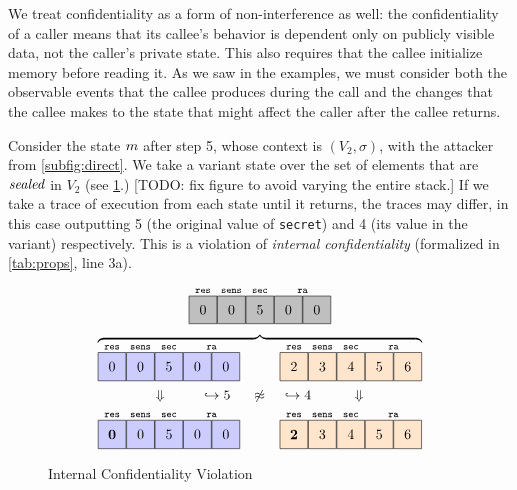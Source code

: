 \documentclass[10pt,conference]{ieeetran}%
\theoremstyle{definition}
\begin{document}
We treat confidentiality as a form of non-interference as well: the confidentiality of a caller
means that its callee's behavior is dependent only on publicly visible data,
not the caller's private state. This also requires that the callee initialize
memory before reading it.
As we saw in the examples, we must consider both the observable events
that the callee produces during the call and the changes that the callee makes to the state that might
affect the caller after the callee returns.

Consider the state \(m\) after step 5, whose context is \((V_2,\sigma)\), with the attacker from
\cref{subfig:direct}. We take a variant state over the set of elements that are
\(\mathit{sealed}\) in \(V_2\) (see \cref{fig:variant2}.)
            [TODO: fix figure to avoid varying the entire stack.]
If we take a trace of execution from each state until it returns,
the traces may differ, in this case outputting 5 (the original value of {\tt secret}) and
4 (its value in the variant) respectively. This is a violation of
{\it internal confidentiality} (formalized in \cref{tab:props}, line 3a).

\begin{figure}
    \centering
    \[
    \stackrel{\texttt{res}}{\numbox[0]}
    \stackrel{\texttt{sens}}{\numbox[0]}
    \stackrel{\texttt{sec}}{\numbox[5]}
    \stackrel{\texttt{ra}}{\numbox[0]\numbox[0]}\]
    \[\overbrace{
    \stackrel{\texttt{res}}{\leftbox[0]}
    \stackrel{\texttt{sens}}{\leftbox[0]}
    \stackrel{\texttt{sec}}{\leftbox[5]}
    \stackrel{\texttt{ra}}{\leftbox[0]\leftbox[0]}
    \hspace{1cm}
    \stackrel{\texttt{res}}{\rightbox[2]}
    \stackrel{\texttt{sens}}{\rightbox[3]}
    \stackrel{\texttt{sec}}{\rightbox[4]}
    \stackrel{\texttt{ra}}{\rightbox[5]\rightbox[6]}}
    \]
    \[\large\Downarrow \hspace{1cm} \large\hookrightarrow 5 \hspace{0.5cm} \not \approx \hspace{0.5cm}
    \large\hookrightarrow 4 \hspace{1cm} \large\Downarrow\]
    \[
    \stackrel{\texttt{res}}{\leftbox[\textbf{0}]}
    \stackrel{\texttt{sens}}{\leftbox[0]}
    \stackrel{\texttt{sec}}{\leftbox[5]}
    \stackrel{\texttt{ra}}{\leftbox[0]\leftbox[0]}
    \hspace{1cm}
    \stackrel{\texttt{res}}{\rightbox[\textbf{2}]}
    \stackrel{\texttt{sens}}{\rightbox[3]}
    \stackrel{\texttt{sec}}{\rightbox[4]}
    \stackrel{\texttt{ra}}{\rightbox[5]\rightbox[6]}
    \]

  \caption{Internal Confidentiality Violation}
  \label{fig:variant2}
\end{figure}
\end{document}

